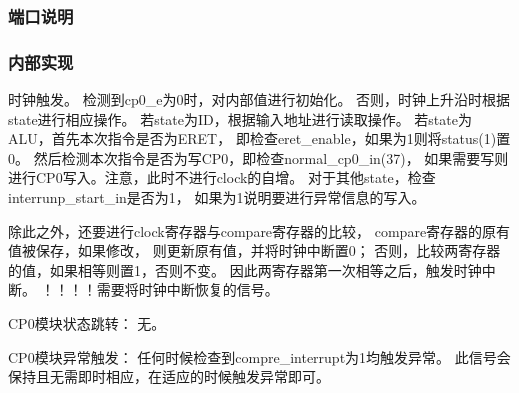        \subsubsection{端口说明}
            
        \subsubsection{内部实现}
            时钟触发。%
            检测到cp0\_e为0时，对内部值进行初始化。%
            否则，时钟上升沿时根据state进行相应操作。%
            若state为ID，根据输入地址进行读取操作。%
            若state为ALU，首先本次指令是否为ERET，%
            即检查eret\_enable，如果为1则将status(1)置0。%
            然后检测本次指令是否为写CP0，即检查normal\_cp0\_in(37)，%
            如果需要写则进行CP0写入。注意，此时不进行clock的自增。%
            对于其他state，检查interrunp\_start\_in是否为1，%
            如果为1说明要进行异常信息的写入。%
            
            除此之外，还要进行clock寄存器与compare寄存器的比较，%
            compare寄存器的原有值被保存，如果修改，%
            则更新原有值，并将时钟中断置0；%
            否则，比较两寄存器的值，如果相等则置1，否则不变。%
            因此两寄存器第一次相等之后，触发时钟中断。%
            ！！！！需要将时钟中断恢复的信号。

            CP0模块状态跳转：%
            无。%

            CP0模块异常触发：%
            任何时候检查到compre\_interrupt为1均触发异常。%
            此信号会保持且无需即时相应，在适应的时候触发异常即可。

